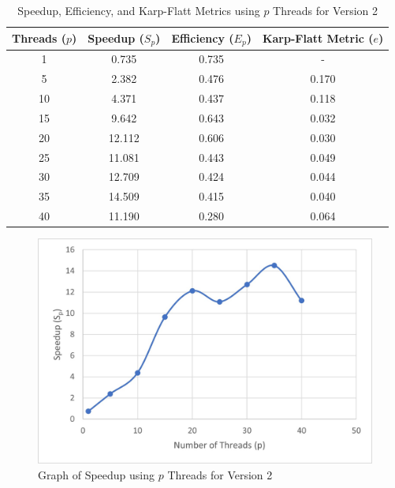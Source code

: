 \begin{table}[H]
    \centering
    \begin{tabular}{cccc}
    \textbf{Threads ($p$)} & \textbf{Speedup ($S_p$)} & \textbf{Efficiency ($E_p$)} & \textbf{Karp-Flatt Metric ($e$)} \\ \hline
    1 & 0.735 & 0.735 & - \\
    5 & 2.382 & 0.476 & 0.170 \\
    10 & 4.371 & 0.437 & 0.118 \\
    15 & 9.642 & 0.643 & 0.032 \\
    20 & 12.112 & 0.606 & 0.030 \\
    25 & 11.081 & 0.443 & 0.049 \\
    30 & 12.709 & 0.424 & 0.044 \\
    35 & 14.509 & 0.415 & 0.040 \\
    40 & 11.190 & 0.280 & 0.064
    \end{tabular}
    \caption{Speedup, Efficiency, and Karp-Flatt Metrics using $p$ Threads for Version 2}
    \label{tab:metricsv2}
\end{table}

\begin{figure}[H]
    \centering
    \includegraphics{Sp2}
    \caption{Graph of Speedup using $p$ Threads for Version 2}
    \label{fig:Sp2}
\end{figure}


